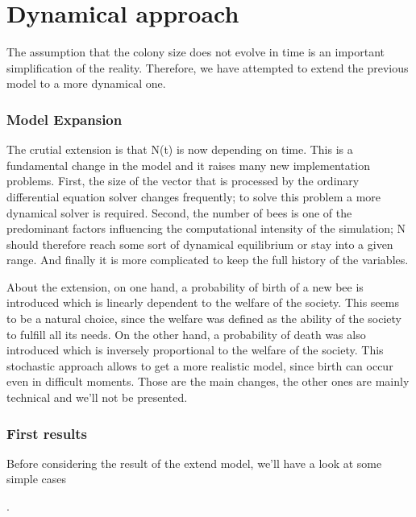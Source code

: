 \section{Dynamical approach}

The assumption that the colony size does not evolve in time is an
important simplification of the reality. Therefore, we have attempted
to extend the previous model to a more dynamical one. 


\subsubsection{Model Expansion}

The crutial extension is that N(t) is now depending on time. This
is a fundamental change in the model and it raises many new implementation
problems. First, the size of the vector that is processed by the ordinary
differential equation solver changes frequently; to solve this problem
a more dynamical solver is required. Second, the number of bees is
one of the predominant factors influencing the computational intensity
of the simulation; N should therefore reach some sort of dynamical
equilibrium or stay into a given range. And finally it is more complicated
to keep the full history of the variables.

About the extension, on one hand, a probability of birth of a new
bee is introduced which is linearly dependent to the welfare of the
society. This seems to be a natural choice, since the welfare was
defined as the ability of the society to fulfill all its needs. On
the other hand, a probability of death was also introduced which is
inversely proportional to the welfare of the society. This stochastic
approach allows to get a more realistic model, since birth can occur
even in difficult moments. Those are the main changes, the other ones
are mainly technical and we'll not be presented.


\subsubsection{First results}

Before considering the result of the extend model, we'll have a look
at some simple cases

. 

